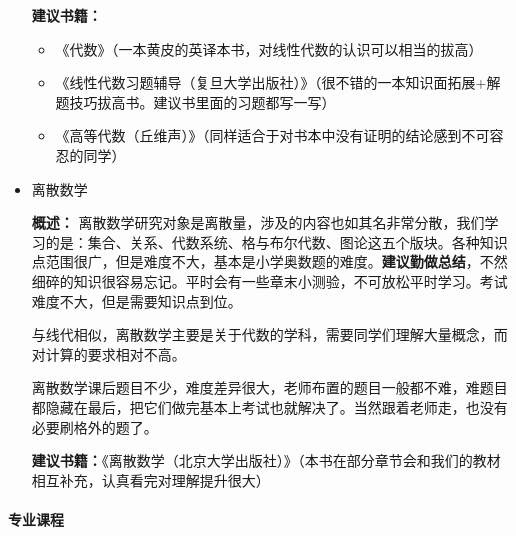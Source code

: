 \documentclass[
decoration,  %
]{qyxf-book}
\begin{document}
\begin{itemize}
	
	\textbf{建议书籍：}
	\begin{itemize}
		\item 《代数》（一本黄皮的英译本书，对线性代数的认识可以相当的拔高）
		\item 《线性代数习题辅导（复旦大学出版社）》（很不错的一本知识面拓展+解题技巧拔高书。建议书里面的习题都写一写）
		\item 《高等代数（丘维声）》（同样适合于对书本中没有证明的结论感到不可容忍的同学）
	\end{itemize}
	
	\item 离散数学
	\par
	\textbf{概述：} 离散数学研究对象是离散量，涉及的内容也如其名非常分散，我们学习的是：集合、关系、代数系统、格与布尔代数、图论这五个版块。各种知识点范围很广，但是难度不大，基本是小学奥数题的难度。\textbf{建议勤做总结}，不然细碎的知识很容易忘记。平时会有一些章末小测验，不可放松平时学习。考试难度不大，但是需要知识点到位。
	
	与线代相似，离散数学主要是关于代数的学科，需要同学们理解大量概念，而对计算的要求相对不高。

	离散数学课后题目不少，难度差异很大，老师布置的题目一般都不难，难题目都隐藏在最后，把它们做完基本上考试也就解决了。当然跟着老师走，也没有必要刷格外的题了。
	
	
	\textbf{建议书籍：}《离散数学（北京大学出版社）》（本书在部分章节会和我们的教材相互补充，认真看完对理解提升很大）
\end{itemize}

\paragraph{专业课程}
\end{document}
